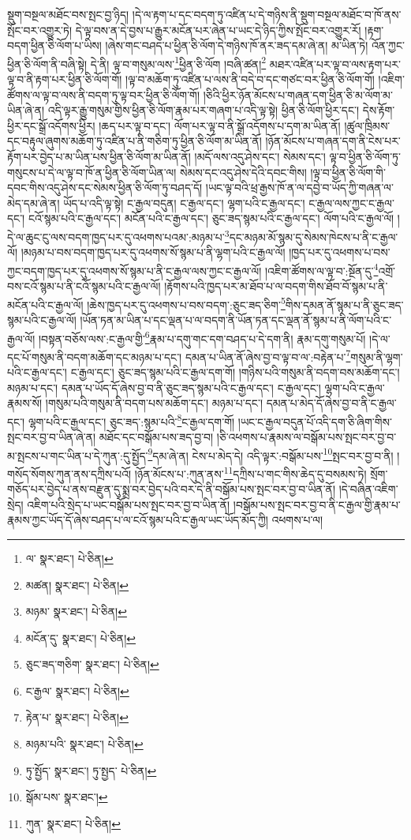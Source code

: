 སྡུག་བསྔལ་མཐོང་བས་སྤང་བྱ་ཉིད། །དེ་ལ་རྟག་པ་དང་བདག་ཏུ་འཛིན་པ་དེ་གཉིས་ནི་སྡུག་བསྔལ་མཐོང་བ་ཁོ་ནས་སྤོང་བར་འགྱུར་ཏེ། དེ་ལྟ་བས་ན་དེ་བྱས་པ་རྒྱུར་མངོན་པར་ཞེན་པ་ཡང་དེ་ཉིད་ཀྱིས་སྤོང་བར་འགྱུར་རོ། །རྟག་བདག་ཕྱིན་ཅི་ལོག་པ་ཡིས། །ཞེས་གང་བཤད་པ་ཕྱིན་ཅི་ལོག་དེ་གཉིས་ཁོ་ནར་ཟད་དམ་ཞེ་ན། མ་ཡིན་ཏེ། འོན་ཀྱང་ཕྱིན་ཅི་ལོག་ནི་བཞི་སྟེ། དེ་ནི། ལྟ་བ་གསུམ་ལས་\footnote{ལ་  སྣར་ཐང་།  པེ་ཅིན། }ཕྱིན་ཅི་ལོག །བཞི་ཚན།\footnote{མཚན།  སྣར་ཐང་།  པེ་ཅིན། } མཐར་འཛིན་པར་ལྟ་བ་ལས་རྟག་པར་ལྟ་བ་ནི་རྟག་པར་ཕྱིན་ཅི་ལོག་གོ། །ལྟ་བ་མཆོག་ཏུ་འཛིན་པ་ལས་ནི་བདེ་བ་དང་གཙང་བར་ཕྱིན་ཅི་ལོག་གོ། །འཇིག་ཚོགས་ལ་ལྟ་བ་ལས་ནི་བདག་ཏུ་ལྟ་བར་ཕྱིན་ཅི་ལོག་གོ། །ཅིའི་ཕྱིར་ཉོན་མོངས་པ་གཞན་དག་ཕྱིན་ཅི་མ་ལོག་མ་ཡིན་ཞེ་ན། འདི་ལྟར་རྒྱུ་གསུམ་གྱིས་ཕྱིན་ཅི་ལོག་རྣམ་པར་གཞག་པ་འདི་ལྟ་སྟེ། ཕྱིན་ཅི་ལོག་ཕྱིར་དང་། དེས་རྟོག་ཕྱིར་དང་སྒྲོ་འདོགས་ཕྱིར། །ཆད་པར་ལྟ་བ་དང་། ལོག་པར་ལྟ་བ་ནི་སྒྲོ་འདོགས་པ་དག་མ་ཡིན་ནོ། །ཚུལ་ཁྲིམས་དང་བརྟུལ་ཞུགས་མཆོག་ཏུ་འཛིན་པ་ནི་གཅིག་ཏུ་ཕྱིན་ཅི་ལོག་མ་ཡིན་ནོ། །ཉོན་མོངས་པ་གཞན་དག་ནི་ངེས་པར་རྟོག་པར་བྱེད་པ་མ་ཡིན་པས་ཕྱིན་ཅི་ལོག་མ་ཡིན་ནོ། །མདོ་ལས་འདུ་ཤེས་དང་། སེམས་དང་། ལྟ་བ་ཕྱིན་ཅི་ལོག་ཏུ་གསུངས་པ་དེ་ལ་ལྟ་བ་ཁོ་ན་ཕྱིན་ཅི་ལོག་ཡིན་ལ། སེམས་དང་འདུ་ཤེས་དེའི་དབང་གིས། །ལྟ་བ་ཕྱིན་ཅི་ལོག་གི་དབང་གིས་འདུ་ཤེས་དང་སེམས་ཕྱིན་ཅི་ལོག་ཏུ་བཤད་དོ། །ཡང་ལྟ་བའི་ཕྲ་རྒྱས་ཁོ་ན་ལ་དབྱེ་བ་ཡོད་ཀྱི་གཞན་ལ་མེད་དམ་ཞེ་ན། ཡོད་པ་འདི་ལྟ་སྟེ། ང་རྒྱལ་བདུན། ང་རྒྱལ་དང་། ལྷག་པའི་ང་རྒྱལ་དང་། ང་རྒྱལ་ལས་ཀྱང་ང་རྒྱལ་དང་། ངའོ་སྙམ་པའི་ང་རྒྱལ་དང་། མངོན་པའི་ང་རྒྱལ་དང་། ཅུང་ཟད་སྙམ་པའི་ང་རྒྱལ་དང་། ལོག་པའི་ང་རྒྱལ་ལོ། །དེ་ལ་ཆུང་ངུ་ལས་བདག་ཁྱད་པར་དུ་འཕགས་པའམ་:མཉམ་པ་\footnote{མཉམ་  སྣར་ཐང་།  པེ་ཅིན། }དང་མཉམ་མོ་སྙམ་དུ་སེམས་ཁེངས་པ་ནི་ང་རྒྱལ་ལོ། །མཉམ་པ་བས་བདག་ཁྱད་པར་དུ་འཕགས་སོ་སྙམ་པ་ནི་ལྷག་པའི་ང་རྒྱལ་ལོ། །ཁྱད་པར་དུ་འཕགས་པ་བས་ཀྱང་བདག་ཁྱད་པར་དུ་འཕགས་སོ་སྙམ་པ་ནི་ང་རྒྱལ་ལས་ཀྱང་ང་རྒྱལ་ལོ། །འཇིག་ཚོགས་ལ་ལྟ་བ་:སྔོན་དུ་\footnote{མངོན་དུ་  སྣར་ཐང་།  པེ་ཅིན། }འགྲོ་བས་ངའོ་སྙམ་པ་ནི་ངའོ་སྙམ་པའི་ང་རྒྱལ་ལོ། །རྟོགས་པའི་ཁྱད་པར་མ་ཐོབ་པ་ལ་བདག་གིས་ཐོབ་བོ་སྙམ་པ་ནི་མངོན་པའི་ང་རྒྱལ་ལོ། །ཆེས་ཁྱད་པར་དུ་འཕགས་པ་བས་བདག་:ཅུང་ཟད་ཅིག་\footnote{ཅུང་ཟད་གཅིག་  སྣར་ཐང་།  པེ་ཅིན། }གིས་དམན་ནོ་སྙམ་པ་ནི་ཅུང་ཟད་སྙམ་པའི་ང་རྒྱལ་ལོ། །ཡོན་ཏན་མ་ཡིན་པ་དང་ལྡན་པ་ལ་བདག་ནི་ཡོན་ཏན་དང་ལྡན་ནོ་སྙམ་པ་ནི་ལོག་པའི་ང་རྒྱལ་ལོ། །བསྟན་བཅོས་ལས་:ང་རྒྱལ་གྱི་\footnote{ང་རྒྱལ་  སྣར་ཐང་།  པེ་ཅིན། }རྣམ་པ་དགུ་གང་དག་བཤད་པ་དེ་དག་ནི། རྣམ་དགུ་གསུམ་པོ། །དེ་ལ་དང་པོ་གསུམ་ནི་བདག་མཆོག་དང་མཉམ་པ་དང་། དམན་པ་ཡིན་ནོ་ཞེས་བྱ་བ་ལྟ་བ་ལ་:བརྟེན་པ་\footnote{རྟེན་པ་  སྣར་ཐང་།  པེ་ཅིན། }གསུམ་ནི་ལྷག་པའི་ང་རྒྱལ་དང་། ང་རྒྱལ་དང་། ཅུང་ཟད་སྙམ་པའི་ང་རྒྱལ་དག་གོ། །གཉིས་པའི་གསུམ་ནི་བདག་བས་མཆོག་དང་། མཉམ་པ་དང་། དམན་པ་ཡོད་དོ་ཞེས་བྱ་བ་ནི་ཅུང་ཟད་སྙམ་པའི་ང་རྒྱལ་དང་། ང་རྒྱལ་དང་། ལྷག་པའི་ང་རྒྱལ་རྣམས་སོ། །གསུམ་པའི་གསུམ་ནི་བདག་པས་མཆོག་དང་། མཉམ་པ་དང་། དམན་པ་མེད་དོ་ཞེས་བྱ་བ་ནི་ང་རྒྱལ་དང་། ལྷག་པའི་ང་རྒྱལ་དང་། ཅུང་ཟད་:སྙམ་པའི་\footnote{མཉམ་པའི་  སྣར་ཐང་།  པེ་ཅིན། }ང་རྒྱལ་དག་གོ། །ཡང་ང་རྒྱལ་བདུན་པོ་འདི་དག་ཅི་ཞིག་གིས་སྤང་བར་བྱ་བ་ཡིན་ཞེ་ན། མཐོང་དང་བསྒོམ་པས་ཟད་བྱ་བ། །ཅི་འཕགས་པ་རྣམས་ལ་བསྒོམ་པས་སྤང་བར་བྱ་བ་མ་སྤངས་པ་གང་ཡིན་པ་དེ་ཀུན་:དུ་སྤྱོད་\footnote{ཏུ་སྤྱོད་  སྣར་ཐང་། ཏུ་སྤྱད་  པེ་ཅིན། }དམ་ཞེ་ན། ངེས་པ་མེད་དེ། འདི་ལྟར་:བསྒོམ་པས་\footnote{སྒོམ་པས་  སྣར་ཐང་། }སྤང་བར་བྱ་བ་ནི། །གསོད་སོགས་ཀུན་ནས་དཀྲིས་པའོ། །ཉོན་མོངས་པ་:ཀུན་ནས་\footnote{ཀུན་  སྣར་ཐང་།  པེ་ཅིན། }དཀྲིས་པ་གང་གིས་ཆེད་དུ་བསམས་ཏེ། སྲོག་གཅོད་པར་བྱེད་པ་ནས་བརྫུན་དུ་སྨྲ་བར་བྱེད་པའི་བར་དེ་ནི་བསྒོམ་པས་སྤང་བར་བྱ་བ་ཡིན་ནོ། །དེ་བཞིན་འཇིག་སྲེད། འཇིག་པའི་སྲེད་པ་ཡང་བསྒོམ་པས་སྤང་བར་བྱ་བ་ཡིན་ནོ། །བསྒོམ་པས་སྤང་བར་བྱ་བ་ནི་ང་རྒྱལ་གྱི་རྣམ་པ་རྣམས་ཀྱང་ཡོད་དོ་ཞེས་བཤད་པ་ལ་ངའོ་སྙམ་པའི་ང་རྒྱལ་ཡང་ཡོད་མོད་ཀྱི། འཕགས་པ་ལ། 